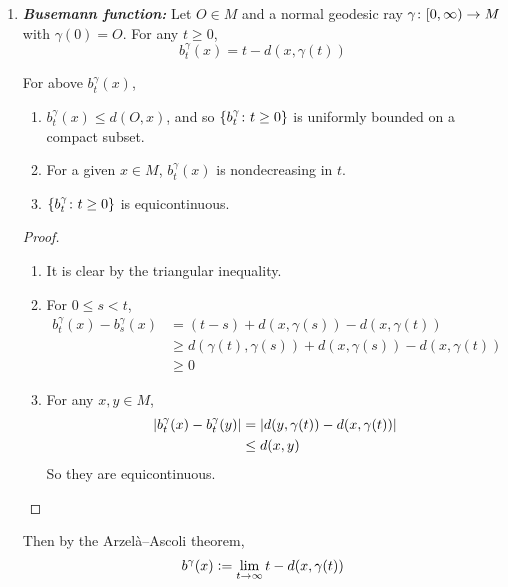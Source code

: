 \begin{enumerate}[label=\arabic{*}.]
	\item \emph{\textbf{Busemann function:}} Let $O \in M$ and a normal geodesic ray $\gamma \colon [0,\infty) \rightarrow M$ with $\gamma(0) = O$. For any $t \geq 0$,
	\begin{equation*}
		b_t^\gamma(x) = t - d(x,\gamma(t))
	\end{equation*}
	\begin{prop}
		For above $b^\gamma_t(x)$,
		\begin{enumerate}[label=(\arabic{*})]
			\item $b^\gamma_t(x) \leq d(O,x)$, and so $\left\{b^\gamma_t \colon t \geq 0\right\}$ is uniformly bounded on a compact subset.
			\item For a given $x \in M$, $b^\gamma_t(x)$ is nondecreasing in $t$.
			\item $\left\{b^\gamma_t \colon t \geq 0\right\}$ is equicontinuous.
		\end{enumerate}
	\end{prop}
	\begin{proof}
		\begin{enumerate}[label=(\arabic{*})]
			\item It is clear by the triangular inequality.
			\item For $0 \leq s < t$,
			\begin{equation*}
				\begin{aligned}
					b^\gamma_t(x) - b^\gamma_s(x) &= (t-s) + d(x,\gamma(s)) - d(x,\gamma(t)) \\
					&\geq d(\gamma(t),\gamma(s)) + d(x,\gamma(s)) - d(x,\gamma(t)) \\
					&\geq 0
				\end{aligned}
			\end{equation*}
			\item For any $x,y \in M$,
			\begin{equation*}
				\begin{aligned}
					\left\lvert b^\gamma_t(x) - b^\gamma_t(y)\right\lvert &= \left\lvert d(y,\gamma(t)) - d(x,\gamma(t))\right\lvert \\
					&\leq d(x,y)
				\end{aligned}
			\end{equation*}
			So they are equicontinuous.
		\end{enumerate}
	\end{proof}
	Then by the Arzel\`a–Ascoli theorem,
	\begin{equation*}
		b^\gamma(x) \defeq \lim_{t \sto \infty} t - d(x,\gamma(t))

\end{equation*}
\end{enumerate}
